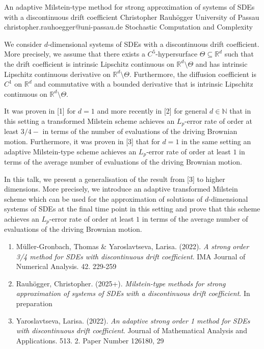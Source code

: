 \begin{talk}
  {An adaptive Milstein-type method for strong approximation of systems of SDEs
   with a discontinuous drift coefficient}%
  {Christopher Rauh\"ogger}%
  {University of Passau}%
  {christopher.rauhoegger@uni-passau.de}%
  {}%
  {Stochastic Computation and Complexity}%
    
   
We consider $d$-dimensional systems of SDEs with a discontinuous drift coefficient. More precisely,
we assume that there exists a $C^{5}$-hypersurface
$\Theta\subseteq \mathbb{R}^{d}$ such that the drift coefficient is intrinsic Lipschitz continuous on $\mathbb{R}^{d}\setminus \Theta$ and has intrinsic Lipschitz continuous derivative on $\mathbb{R}^{d}\setminus \Theta$.
Furthermore, the diffusion coefficient is $C^{1}$ on $\mathbb{R}^{d}$ and commutative with a bounded derivative that is intrinsic Lipschitz continuous on $\mathbb{R}^{d}\setminus \Theta$.

It was proven in [1] for $d = 1$ and more recently in [2] for general $d \in \mathbb{N}$ that in this setting a transformed Milstein scheme achieves an $L_{p}$-error rate of order at least $3/4-$ in terms of the number of evaluations of the
driving Brownian motion.
Furthermore, it was proven in [3] that for $d = 1$ in the same setting an adaptive Milstein-type scheme achieves an $L_{p}$-error rate of order at least $1$ in terms of the average number of evaluations of the driving Brownian motion. 

In this talk, we present a generalisation of the result from [3] to higher dimensions. More precisely, we introduce an adaptive transformed Milstein scheme which can be used for the approximation of solutions of $d$-dimensional systems of SDEs at the final time point in this setting and
prove that this scheme achieves an $L_{p}$-error rate of order at least $1$ in terms of the average number of evaluations of the
driving Brownian motion.

\medskip

\begin{enumerate}
 \item[{[1]}] M\"{u}ller-Gronbach, Thomas \& Yaroslavtseva, Larisa. (2022). {\it A strong order 3/4 method for {SDE}s with discontinuous drift
  coefficient}. IMA Journal of Numerical Analysis. 42. 229-259
 \item[{[2]}] Rauh\"ogger, Christopher. (2025+). {\it Milstein-type methods for strong approximation of systems of SDEs with a discontinuous drift coefficient}. In preparation
 \item[{[3]}] Yaroslavtseva, Larisa. (2022). {\it An adaptive strong order 1 method for {SDE}s with
  discontinuous drift coefficient}. Journal of Mathematical Analysis and Applications. 513. 2. Paper Number 126180, 29
\end{enumerate}

\end{talk}

